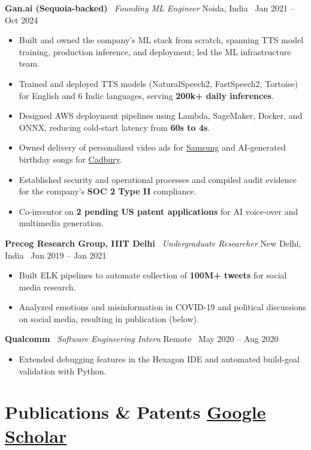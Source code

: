\documentclass[11pt]{article}
\newcommand{\job}[4]{%
  \textbf{#1} \textbar\ \textit{#2}
  \hfill #3 \textbar\ #4\par\vspace{1pt}
}
\begin{document}
\vspace{3pt}
\job{Gan.ai (Sequoia-backed)}
    {Founding ML Engineer}
    {Noida, India}
    {Jan 2021 -- Oct 2024}
\begin{itemize}
  \item Built and owned the company's ML stack from scratch, spanning TTS model training, production inference, and deployment; led the ML infrastructure team.
  \item Trained and deployed TTS models (NaturalSpeech2, FastSpeech2, Tortoise) for English and 6 Indic languages, serving \textbf{200k+ daily inferences}.
  \item Designed AWS deployment pipelines using Lambda, SageMaker, Docker, and ONNX, reducing cold-start latency from \textbf{60s to 4s}.
  \item Owned delivery of personalized video ads for \href{https://www.youtube.com/watch?v=bsAu_GSFEXM}{Samsung} and AI-generated birthday songs for \href{https://www.youtube.com/watch?v=uvzX71ff2pg}{Cadbury}.
  \item Established security and operational processes and compiled audit evidence for the company's \textbf{SOC 2 Type II} compliance.
  \item Co-inventor on \textbf{2 pending US patent applications} for AI voice-over and multimedia generation.
\end{itemize}

\vspace{3pt}
\job{Precog Research Group, IIIT Delhi}
    {Undergraduate Researcher}
    {New Delhi, India}
    {Jun 2019 -- Jan 2021}
\begin{itemize}
  \item Built ELK pipelines to automate collection of \textbf{100M+ tweets} for social media research.
  \item Analyzed emotions and misinformation in COVID-19 and political discussions on social media, resulting in publication (below).
\end{itemize}

\vspace{3pt}
\job{Qualcomm}
    {Software Engineering Intern}
    {Remote}
    {May 2020 -- Aug 2020}
\begin{itemize}
  \item Extended debugging features in the Hexagon IDE and automated build-goal validation with Python.
\end{itemize}

\section{Publications \& Patents \hfill {\normalfont\normalsize
\href{https://scholar.google.com/citations?user=3R23LMAAAAAJ}{Google Scholar}}}
\end{document}
